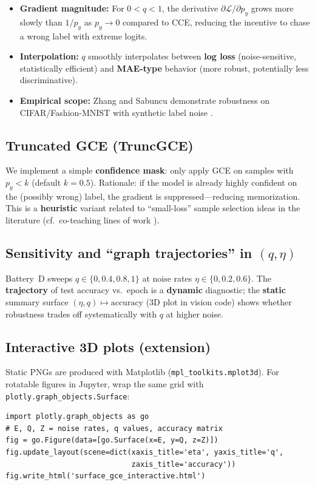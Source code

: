 \documentclass[11pt,a4paper]{article}
\begin{document}
\begin{itemize}[leftmargin=*]
  \item \textbf{Gradient magnitude:} For $0<q<1$, the derivative $\partial \mathcal{L}/\partial p_y$ grows more slowly than $1/p_y$ as $p_y \to 0$ compared to CCE, reducing the incentive to chase a wrong label with extreme logits.
  \item \textbf{Interpolation:} $q$ smoothly interpolates between \textbf{log loss} (noise-sensitive, statistically efficient) and \textbf{MAE-type} behavior (more robust, potentially less discriminative).
  \item \textbf{Empirical scope:} Zhang and Sabuncu demonstrate robustness on CIFAR/Fashion-MNIST with synthetic label noise \cite{zhang2018gce}.
\end{itemize}

\subsection{Truncated GCE (TruncGCE)}

We implement a simple \textbf{confidence mask}: only apply GCE on samples with $p_y < k$ (default $k=0.5$). Rationale: if the model is already highly confident on the (possibly wrong) label, the gradient is suppressed---reducing memorization. This is a \textbf{heuristic} variant related to ``small-loss'' sample selection ideas in the literature (cf.\ co-teaching lines of work \cite{han2018}).

\subsection{Sensitivity and ``graph trajectories'' in $(q,\eta)$}

Battery~D sweeps $q \in \{0, 0.4, 0.8, 1\}$ at noise rates $\eta \in \{0, 0.2, 0.6\}$. The \textbf{trajectory} of test accuracy vs.\ epoch is a \textbf{dynamic} diagnostic; the \textbf{static} summary surface $(\eta, q) \mapsto \text{accuracy}$ (3D plot in vision code) shows whether robustness trades off systematically with $q$ at higher noise.

\subsection{Interactive 3D plots (extension)}
Static PNGs are produced with Matplotlib (\texttt{mpl\_toolkits.mplot3d}). For rotatable figures in Jupyter, wrap the same grid with \texttt{plotly.graph\_objects.Surface}:
\begin{verbatim}
import plotly.graph_objects as go
# E, Q, Z = noise rates, q values, accuracy matrix
fig = go.Figure(data=[go.Surface(x=E, y=Q, z=Z)])
fig.update_layout(scene=dict(xaxis_title='eta', yaxis_title='q',
                             zaxis_title='accuracy'))
fig.write_html('surface_gce_interactive.html')
\end{verbatim}
\end{document}
